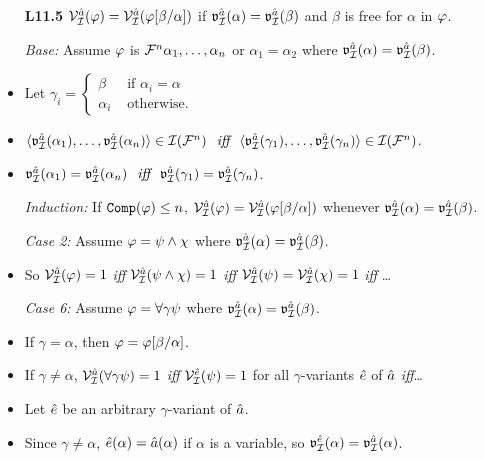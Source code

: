\documentclass[a4paper, 11pt]{article} %
\begin{document}
\begin{itemize}
  \item[\bf L11.5] $\mathcal{V}_{\mathcal{I}}^{\hat{a}}(\varphi)=\mathcal{V}_{\mathcal{I}}^{\hat{a}}(\varphi[\beta/\alpha])$ if $\mathfrak{v}_{\mathcal{I}}^{\hat{a}}(\alpha)=\mathfrak{v}_{\mathcal{I}}^{\hat{a}}(\beta)$ and $\beta$ is free for $\alpha$ in $\varphi$.
    \item[\it Base:] Assume $\varphi$ is $\mathcal{F}^n\alpha_1,\ldots,\alpha_n$ or $\alpha_1=\alpha_2$ where $\mathfrak{v}_{\mathcal{I}}^{\hat{a}}(\alpha)=\mathfrak{v}_{\mathcal{I}}^{\hat{a}}(\beta)$. 
    \item Let $\gamma_i=
      \begin{cases}
        \beta     & \text{ if } \alpha_i=\alpha\\
        \alpha_i  & \text{ otherwise.}
      \end{cases}$
    \item $\langle\mathfrak{v}_{\mathcal{I}}^{\hat{a}}(\alpha_1),\ldots,\mathfrak{v}_{\mathcal{I}}^{\hat{a}}(\alpha_n)\rangle\in\mathcal{I}(\mathcal{F}^n) \textit{ ~iff~ } \langle\mathfrak{v}_{\mathcal{I}}^{\hat{a}}(\gamma_1),\ldots,\mathfrak{v}_{\mathcal{I}}^{\hat{a}}(\gamma_n)\rangle\in\mathcal{I}(\mathcal{F}^n)$.
    \item $\mathfrak{v}_{\mathcal{I}}^{\hat{a}}(\alpha_1)=\mathfrak{v}_{\mathcal{I}}^{\hat{a}}(\alpha_n) \textit{ ~iff~ } \mathfrak{v}_{\mathcal{I}}^{\hat{a}}(\gamma_1)=\mathfrak{v}_{\mathcal{I}}^{\hat{a}}(\gamma_n)$.
    \item[\it Induction:] If $\texttt{Comp}(\varphi)\leq n$, $\mathcal{V}_{\mathcal{I}}^{\hat{a}}(\varphi)=\mathcal{V}_{\mathcal{I}}^{\hat{a}}(\varphi[\beta/\alpha])$ whenever $\mathfrak{v}_{\mathcal{I}}^{\hat{a}}(\alpha)=\mathfrak{v}_{\mathcal{I}}^{\hat{a}}(\beta)$.
    \item[\it Case 2:] Assume $\varphi=\psi\wedge\chi$ where $\mathfrak{v}_{\mathcal{I}}^{\hat{a}}(\alpha)=\mathfrak{v}_{\mathcal{I}}^{\hat{a}}(\beta)$.
    \item So $\mathcal{V}_{\mathcal{I}}^{\hat{a}}(\varphi)=1$ \textit{iff} $\mathcal{V}_{\mathcal{I}}^{\hat{a}}(\psi\wedge\chi)=1$ \textit{iff} $\mathcal{V}_{\mathcal{I}}^{\hat{a}}(\psi)=\mathcal{V}_{\mathcal{I}}^{\hat{a}}(\chi)=1$ \textit{iff} \ldots
    \item[\it Case 6:] Assume $\varphi=\forall \gamma\psi$ where $\mathfrak{v}_{\mathcal{I}}^{\hat{a}}(\alpha)=\mathfrak{v}_{\mathcal{I}}^{\hat{a}}(\beta)$.
    \item If $\gamma=\alpha$, then $\varphi=\varphi[\beta/\alpha]$.
    \item If $\gamma\neq\alpha$, $\mathcal{V}_{\mathcal{I}}^{\hat{a}}(\forall \gamma\psi)=1$ \textit{iff} $\mathcal{V}_{\mathcal{I}}^{\hat{e}}(\psi)=1$ for all $\gamma$-variants $\hat{e}$ of $\hat{a}$ \textit{iff}\ldots
    \item Let $\hat{e}$ be an arbitrary $\gamma$-variant of $\hat{a}$.
    \item Since $\gamma\neq\alpha$, $\hat{e}(\alpha)=\hat{a}(\alpha)$ if $\alpha$ is a variable, so $\mathfrak{v}_{\mathcal{I}}^{\hat{e}}(\alpha)=\mathfrak{v}_{\mathcal{I}}^{\hat{a}}(\alpha)$. 

\end{itemize}
\end{document}
